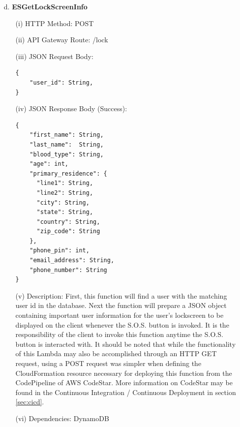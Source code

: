 \documentclass[10pt, a4paper]{article}
\begin{document}
\begin{enumerate}
	\item[d.] \textbf{ESGetLockScreenInfo}
		\begin{itemize}		
		\item[(i)] HTTP Method: POST
		\item[(ii)] API Gateway Route: /lock
		\item[(iii)] JSON Request Body:
			\begin{lstlisting}
{
    "user_id": String,
}
			\end{lstlisting}
		\item[(iv)] JSON Response Body (Success):
			\begin{lstlisting}
{
    "first_name": String,
    "last_name":  String,
    "blood_type": String,
    "age": int,
    "primary_residence": {
      "line1": String,
      "line2": String,
      "city": String,
      "state": String,
      "country": String,
      "zip_code": String
    },
    "phone_pin": int,
    "email_address": String,
    "phone_number": String
}
			\end{lstlisting}
		\item[(v)] Description: First, this function will find a user with the matching user id in the database. Next the function will prepare a JSON object containing important user information for the user's lockscreen to be displayed on the client whenever the S.O.S. button is invoked. It is the responsibility of the client to invoke this function anytime the S.O.S. button is interacted with. It should be noted that while the functionality of this Lambda may also be accomplished through an HTTP GET request, using a POST request was simpler when defining the CloudFormation resource necessary for deploying this function from the CodePipeline of AWS CodeStar. More information on CodeStar may be found in the Continuous Integration / Continuous Deployment in section \ref{sec:cicd}.
		\item[(vi)] Dependencies: DynamoDB
		\end{itemize}
	

\end{enumerate}
\end{document}
